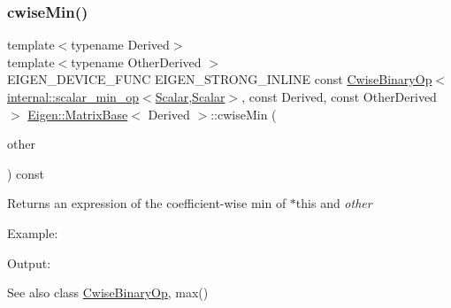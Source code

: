 \subsubsection{\texorpdfstring{cwiseMin()}{cwiseMin()}\hspace{0.1cm}{\footnotesize\ttfamily [1/2]}}
{\footnotesize\ttfamily template$<$typename Derived$>$ \\
template$<$typename Other\+Derived $>$ \\
E\+I\+G\+E\+N\+\_\+\+D\+E\+V\+I\+C\+E\+\_\+\+F\+U\+NC E\+I\+G\+E\+N\+\_\+\+S\+T\+R\+O\+N\+G\+\_\+\+I\+N\+L\+I\+NE const \mbox{\hyperlink{class_eigen_1_1_cwise_binary_op}{Cwise\+Binary\+Op}}$<$\mbox{\hyperlink{struct_eigen_1_1internal_1_1scalar__min__op}{internal\+::scalar\+\_\+min\+\_\+op}}$<$\mbox{\hyperlink{class_eigen_1_1_dense_base_a5feed465b3a8e60c47e73ecce83e39a2}{Scalar}},\mbox{\hyperlink{class_eigen_1_1_dense_base_a5feed465b3a8e60c47e73ecce83e39a2}{Scalar}}$>$, const Derived, const Other\+Derived$>$ \mbox{\hyperlink{class_eigen_1_1_matrix_base}{Eigen\+::\+Matrix\+Base}}$<$ Derived $>$\+::cwise\+Min (\begin{DoxyParamCaption}\item[{const E\+I\+G\+E\+N\+\_\+\+C\+U\+R\+R\+E\+N\+T\+\_\+\+S\+T\+O\+R\+A\+G\+E\+\_\+\+B\+A\+S\+E\+\_\+\+C\+L\+A\+SS$<$ Other\+Derived $>$ \&}]{other }\end{DoxyParamCaption}) const\hspace{0.3cm}{\ttfamily [inline]}}

\begin{DoxyReturn}{Returns}
an expression of the coefficient-\/wise min of $\ast$this and {\itshape other} 
\end{DoxyReturn}
Example\+: 
\begin{DoxyCodeInclude}{0}
\end{DoxyCodeInclude}
 Output\+: 
\begin{DoxyVerbInclude}
\end{DoxyVerbInclude}


\begin{DoxySeeAlso}{See also}
class \mbox{\hyperlink{class_eigen_1_1_cwise_binary_op}{Cwise\+Binary\+Op}}, max() 
\end{DoxySeeAlso}
\mbox{\label{class_eigen_1_1_matrix_base_a1fe128db1212934573807865ec872dbd}} 

